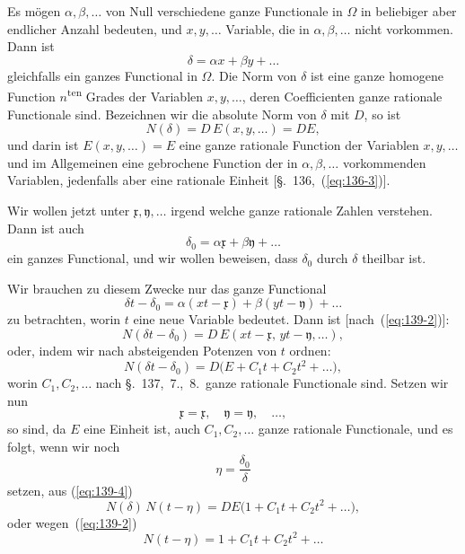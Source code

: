 \documentclass[12pt,a4paper]{article}
\theoremstyle{definition}
\begin{document}
Es mögen $\alpha,\beta,\dots$ von Null verschiedene ganze Functionale in $\Omega$ in beliebiger aber endlicher Anzahl bedeuten, und $x,y,\dots$ Variable, die in $\alpha,\beta,\dots$ nicht vorkommen. Dann ist
\begin{equation}\label{eq:139-1}
\delta = \alpha x + \beta y + \dots
\end{equation}
gleichfalls ein ganzes Functional in $\Omega$. Die Norm von $\delta$ ist eine ganze homogene Function $n$\textsuperscript{ten} Grades der Variablen $x,y,\dots$, deren Coefficienten ganze rationale Functionale sind. Bezeichnen wir die absolute Norm von $\delta$ mit $D$, so ist
\begin{equation}\label{eq:139-2}
N(\delta) = D\,E(x,y,\dots) = DE,
\end{equation}
und darin ist $E(x,y,\dots)=E$ eine ganze rationale Function der Variablen $x,y,\dots$ und im Allgemeinen eine gebrochene Function der in $\alpha,\beta,\dots$ vorkommenden Variablen, jedenfalls aber eine rationale Einheit [\S.~136,~(\ref{eq:136-3})].

Wir wollen jetzt unter $\mathfrak{x},\mathfrak{y},\dots$ irgend welche ganze rationale Zahlen verstehen. Dann ist auch
\[
\delta_0 = \alpha\mathfrak{x} + \beta\mathfrak{y} + \dots
\]
ein ganzes Functional, und wir wollen beweisen, dass $\delta_0$ durch $\delta$ theilbar ist.

Wir brauchen zu diesem Zwecke nur das ganze Functional
\[
\delta t - \delta_0 = \alpha(xt-\mathfrak{x}) + \beta(yt-\mathfrak{y}) + \dots
\]
zu betrachten, worin $t$ eine neue Variable bedeutet. Dann ist [nach~(\ref{eq:139-2})]:
\begin{equation}\label{eq:139-3}
N(\delta t - \delta_0) = D\,E(xt-\mathfrak{x},\,yt-\mathfrak{y},\dots),
\end{equation}
oder, indem wir nach absteigenden Potenzen von $t$ ordnen:
\begin{equation}\label{eq:139-4}
N(\delta t - \delta_0) = D\bigl(E + C_1t + C_2t^2 + \dots\bigr),
\end{equation}
worin $C_1,C_2,\dots$ nach \S.~137,~7.,~8.\ ganze rationale Functionale sind. Setzen wir nun
\[
\mathfrak{x}=\mathfrak{x},\quad \mathfrak{y}=\mathfrak{y},\quad \dots,
\]
so sind, da $E$ eine Einheit ist, auch $C_1,C_2,\dots$ ganze rationale Functionale, und es folgt, wenn wir noch
\[
\eta = \frac{\delta_0}{\delta}
\]
setzen, aus (\ref{eq:139-4})
\[
N(\delta)\,N(t-\eta) = DE\bigl(1 + C_1t + C_2t^2 + \dots\bigr),
\]
oder wegen~(\ref{eq:139-2})
\begin{equation}\label{eq:139-5}
N(t-\eta) = 1 + C_1t + C_2t^2 + \dots
\end{equation}
\end{document}
